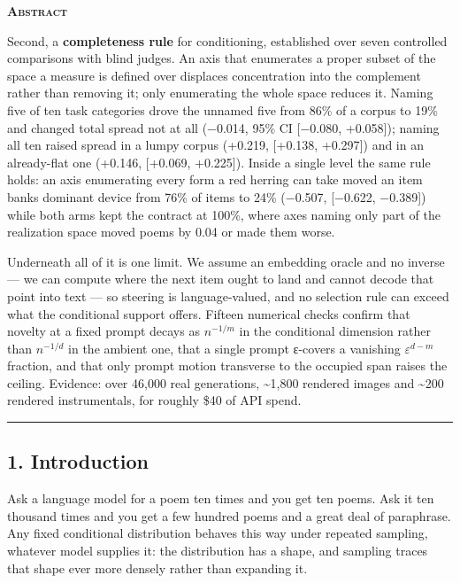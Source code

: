 \documentclass[
  10pt,
]{article}
\theoremstyle{plain}
\theoremstyle{definition}
\newenvironment{iclrabstract}
  {\vspace{0.4em}\begin{center}{\bfseries\scshape Abstract}\end{center}
   \begin{list}{}{\setlength{\leftmargin}{0.45in}\setlength{\rightmargin}{0.45in}}\item[]\relax}
  {\end{list}\vspace{0.6em}}
\begin{document}
\begin{iclrabstract}
Second, a \textbf{completeness rule} for conditioning, established over
seven controlled comparisons with blind judges. An axis that enumerates
a proper subset of the space a measure is defined over displaces
concentration into the complement rather than removing it; only
enumerating the whole space reduces it. Naming five of ten task
categories drove the unnamed five from 86\% of a corpus to 19\% and
changed total spread not at all (−0.014, 95\% CI {[}−0.080, +0.058{]});
naming all ten raised spread in a lumpy corpus (+0.219, {[}+0.138,
+0.297{]}) and in an already-flat one (+0.146, {[}+0.069, +0.225{]}).
Inside a single level the same rule holds: an axis enumerating every
form a red herring can take moved an item bank\textquotesingle s
dominant device from 76\% of items to 24\% (−0.507, {[}−0.622,
−0.389{]}) while both arms kept the contract at 100\%, where axes naming
only part of the realization space moved poems by 0.04 or made them
worse.

Underneath all of it is one limit. We assume an embedding oracle and no
inverse --- we can compute where the next item ought to land and cannot
decode that point into text --- so steering is language-valued, and no
selection rule can exceed what the conditional support offers. Fifteen
numerical checks confirm that novelty at a fixed prompt decays as
\(n^{-1/m}\) in the conditional dimension rather than \(n^{-1/d}\) in
the ambient one, that a single prompt ε-covers a vanishing \(ε^{d-m}\)
fraction, and that only prompt motion transverse to the occupied span
raises the ceiling. Evidence: over 46,000 real generations,
\textasciitilde1,800 rendered images and \textasciitilde200 rendered
instrumentals, for roughly \$40 of API spend.

\begin{center}\rule{0.5\linewidth}{0.5pt}\end{center}

\end{iclrabstract}

\subsection{1. Introduction}\label{1-introduction}

Ask a language model for a poem ten times and you get ten poems. Ask it
ten thousand times and you get a few hundred poems and a great deal of
paraphrase. Any fixed conditional distribution behaves this way under
repeated sampling, whatever model supplies it: the distribution has a
shape, and sampling traces that shape ever more densely rather than
expanding it.
\end{document}
